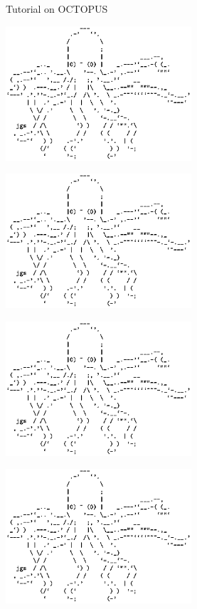 \documentclass{article}
\begin{document}
\begin{center}
\Large Tutorial on OCTOPUS
\end{center}

\vspace{1cm}

\begin{center}
\hspace*{-3cm}
\includegraphics[height=5cm]{img/cover.ps}
\end{center}

\begin{flushright}
\includegraphics[height=5cm]{img/cover.ps}
\end{flushright}

\vspace{-2cm}

\begin{flushleft}
\includegraphics[height=5cm]{img/cover.ps}
\end{flushleft}

\begin{flushright}
\includegraphics[height=5cm]{img/cover.ps}
\hspace*{2cm}
\end{flushright}
\end{document}
